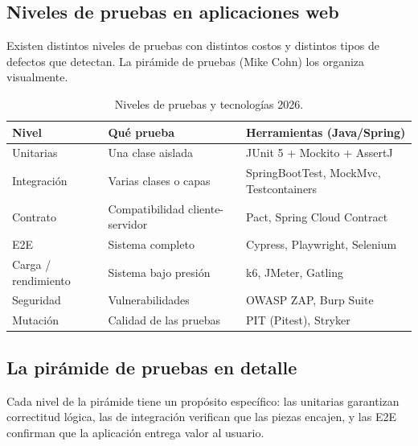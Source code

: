 \subsection{Niveles de pruebas en aplicaciones web}

Existen distintos niveles de pruebas con distintos costos y
distintos tipos de defectos que detectan. La pirámide de pruebas
(Mike Cohn) los organiza visualmente.


\begin{table}[htbp]
\centering
\caption{Niveles de pruebas y tecnologías 2026.}
\footnotesize
\begin{tabularx}{\textwidth}{lXX}
\toprule
\textbf{Nivel} & \textbf{Qué prueba} & \textbf{Herramientas (Java/Spring)}\\
\midrule
Unitarias    & Una clase aislada & JUnit 5 + Mockito + AssertJ\\
Integración  & Varias clases o capas & SpringBootTest, MockMvc, Testcontainers\\
Contrato     & Compatibilidad cliente-servidor & Pact, Spring Cloud Contract\\
E2E          & Sistema completo & Cypress, Playwright, Selenium\\
Carga / rendimiento & Sistema bajo presión & k6, JMeter, Gatling\\
Seguridad    & Vulnerabilidades & OWASP ZAP, Burp Suite\\
Mutación     & Calidad de las pruebas & PIT (Pitest), Stryker\\
\bottomrule
\end{tabularx}
\end{table}

\subsection{La pirámide de pruebas en detalle}

Cada nivel de la pirámide tiene un propósito específico:
las unitarias garantizan correctitud lógica, las de integración
verifican que las piezas encajen, y las E2E confirman que la
aplicación entrega valor al usuario.


